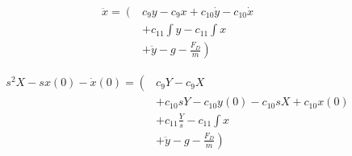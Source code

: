 \begin{align}\nonumber
	\ddot{x} = \left( \right. & c_9 y - c_9 x + c_{10} \dot{y} - c_{10} \dot{x} \\\nonumber
	& + c_{11} \int y - c_{11} \int x \\\nonumber
	& + \left. \ddot{y} - g - \frac{F_D}{m} \right)
\end{align}


\begin{align}\nonumber
	s^2 X - s x(0) - \dot{x}(0) = \left( \right. & c_9 Y - c_9 X \\\nonumber
	& + c_{10} sY - c_{10} y(0) - c_{10} sX + c_{10} x(0) \\\nonumber
	& + c_{11} \frac{Y}{s} - c_{11} \int x \\\nonumber
	& + \left. \ddot{y} - g - \frac{F_D}{m} \right)
\end{align}







